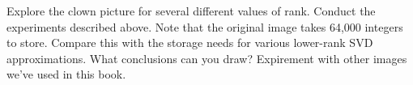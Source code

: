 \begin{problem}
Explore the clown picture for several different values of rank.
Conduct the experiments described above.  Note that the original
image takes 64,000 integers to store.  Compare this with the storage
needs for various lower-rank SVD approximations. What conclusions
can you draw? Expirement with other images we've used in this book.
\end{problem}

